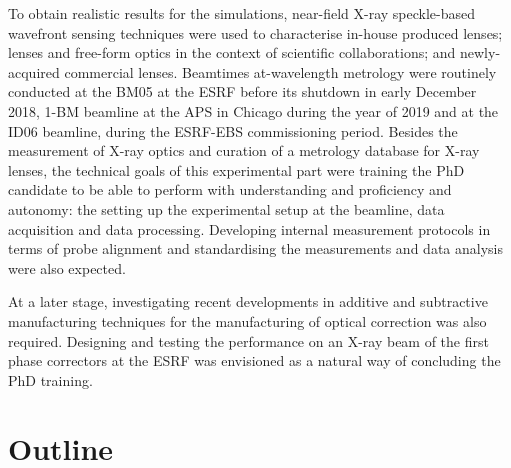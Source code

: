 To obtain realistic results for the simulations, near-field X-ray speckle-based wavefront sensing techniques were used to characterise in-house produced lenses; lenses and free-form optics in the context of scientific collaborations; and newly-acquired commercial lenses. Beamtimes at-wavelength metrology were routinely conducted at the BM05 at the ESRF before its shutdown in early December 2018, 1-BM beamline at the APS in Chicago during the year of 2019 and at the ID06 beamline, during the ESRF-EBS commissioning period. Besides the measurement of X-ray optics and curation of a metrology database for X-ray lenses, the technical goals of this experimental part were training the PhD candidate to be able to perform with understanding and proficiency and autonomy: the setting up the experimental setup at the beamline, data acquisition and data processing. Developing internal measurement protocols in terms of probe alignment and standardising the measurements and data analysis were also expected. 

At a later stage, investigating recent developments in additive and subtractive manufacturing techniques for the manufacturing of optical correction was also required. Designing and testing the performance on an X-ray beam of the first phase correctors at the ESRF was envisioned as a natural way of concluding the PhD training.

\section*{Outline}

